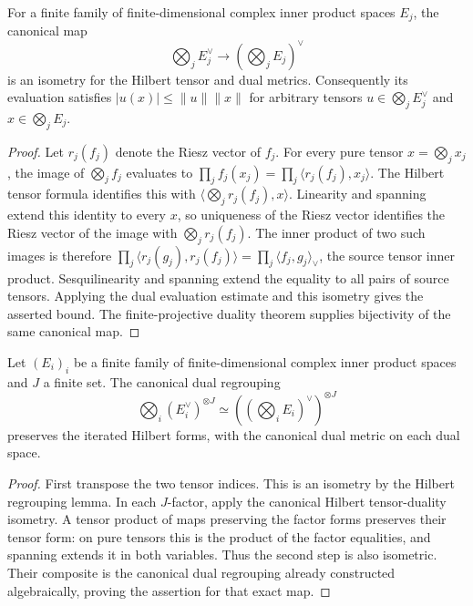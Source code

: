 \begin{lemma}
\label{lem:hilbert-tensor-duality}
\leanok
For a finite family of finite-dimensional complex inner product spaces $E_j$,
the canonical map
\[
 \bigotimes_j E_j^\vee\longrightarrow\left(\bigotimes_j E_j\right)^\vee
\]
is an isometry for the Hilbert tensor and dual metrics. Consequently its
evaluation satisfies $|u(x)|\leq\|u\|\|x\|$ for arbitrary tensors
$u\in\bigotimes_j E_j^\vee$ and $x\in\bigotimes_j E_j$.
\end{lemma}
\begin{proof}
Let $r_j(f_j)$ denote the Riesz vector of $f_j$. For every pure tensor
$x=\bigotimes_jx_j$, the image of $\bigotimes_jf_j$ evaluates to
$\prod_j f_j(x_j)=\prod_j\langle r_j(f_j),x_j\rangle$.
The Hilbert tensor formula identifies this with
$\langle\bigotimes_jr_j(f_j),x\rangle$. Linearity and spanning extend
this identity to every $x$, so uniqueness of the Riesz vector identifies
the Riesz vector of the image with $\bigotimes_jr_j(f_j)$.
The inner product of two such images is therefore
$\prod_j\langle r_j(g_j),r_j(f_j)\rangle
=\prod_j\langle f_j,g_j\rangle_\vee$, the source tensor inner product.
Sesquilinearity and spanning extend the equality to all pairs of source
tensors. Applying the dual evaluation estimate and this isometry gives
the asserted bound. The finite-projective duality theorem supplies
bijectivity of the same canonical map.
\end{proof}

\begin{lemma}
\label{lem:dual-regrouping-isometry}
\leanok
Let $(E_i)_i$ be a finite family of finite-dimensional complex inner
product spaces and $J$ a finite set. The canonical dual regrouping
\[
 \bigotimes_i(E_i^\vee)^{\otimes J}
 \simeq\left(\left(\bigotimes_iE_i\right)^\vee\right)^{\otimes J}
\]
preserves the iterated Hilbert forms, with the canonical dual metric
on each dual space.
\end{lemma}
\begin{proof}
First transpose the two tensor indices. This is an isometry by the
Hilbert regrouping lemma. In each $J$-factor, apply the canonical
Hilbert tensor-duality isometry. A tensor product of maps preserving
the factor forms preserves their tensor form: on pure tensors this
is the product of the factor equalities, and spanning extends it in
both variables. Thus the second step is also isometric. Their
composite is the canonical dual regrouping already constructed
algebraically, proving the assertion for that exact map.
\end{proof}

